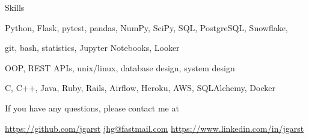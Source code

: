 \documentclass[11pt,a4paper]{article}
\begin{document}
\begin{mysection}{Skills}

  \begin{addmargin}[0.5em]{0em}
    \phantom{\large\bfseries Software Fundamentals: \quad}
    Python, Flask, pytest, pandas, NumPy, SciPy, SQL, PostgreSQL, Snowflake,
  \end{addmargin}

  \begin{addmargin}[0.5em]{0em}
    \makebox[0pt][l]{}
    \phantom{\large\bfseries Software Fundamentals: \quad}
    git, bash, statistics, Jupyter Notebooks, Looker
  \end{addmargin}

  \begin{addmargin}[0.5em]{0em}
    \phantom{\large\bfseries Software Fundamentals: \quad}
    OOP, REST APIs, unix/linux, database design, system design
  \end{addmargin}

  \begin{addmargin}[0.5em]{0em}
    \phantom{\large\bfseries Software Fundamentals: \quad}
    C, C++, Java, Ruby, Rails, Airflow, Heroku, AWS, SQLAlchemy, Docker
  \end{addmargin}

\end{mysection}

\vfill

\begin{center}
    If you have any questions, please contact me at
\end{center}

\begin{center}
  \href{https://github.com/jgarst}{https://github.com/jgarst} 
  \textbullet{}
  \href{mailto:jhg@fastmail.com}{jhg@fastmail.com}
  \textbullet{}
  \href{https://www.linkedin.com/in/jgarst}
       {https://www.linkedin.com/in/jgarst}
\end{center}
\end{document}
